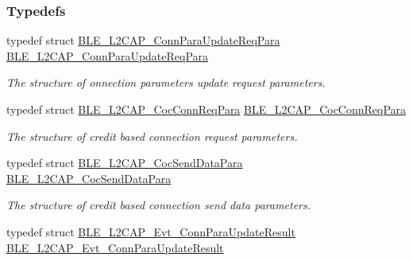 \subsubsection*{Typedefs}
\begin{DoxyCompactItemize}
\item 
typedef struct \hyperlink{struct_b_l_e___l2_c_a_p___conn_para_update_req_para}{B\+L\+E\+\_\+\+L2\+C\+A\+P\+\_\+\+Conn\+Para\+Update\+Req\+Para} \hyperlink{group___b_l_e___l2_c_a_p_gad092b75e4f1a1a8999145c26226842c8}{B\+L\+E\+\_\+\+L2\+C\+A\+P\+\_\+\+Conn\+Para\+Update\+Req\+Para}\hypertarget{group___b_l_e___l2_c_a_p_gad092b75e4f1a1a8999145c26226842c8}{}\label{group___b_l_e___l2_c_a_p_gad092b75e4f1a1a8999145c26226842c8}

\begin{DoxyCompactList}\small\item\em The structure of onnection parameters update request parameters. \end{DoxyCompactList}\item 
typedef struct \hyperlink{struct_b_l_e___l2_c_a_p___coc_conn_req_para}{B\+L\+E\+\_\+\+L2\+C\+A\+P\+\_\+\+Coc\+Conn\+Req\+Para} \hyperlink{group___b_l_e___l2_c_a_p_ga83555390496fae5534c718cad6b50442}{B\+L\+E\+\_\+\+L2\+C\+A\+P\+\_\+\+Coc\+Conn\+Req\+Para}\hypertarget{group___b_l_e___l2_c_a_p_ga83555390496fae5534c718cad6b50442}{}\label{group___b_l_e___l2_c_a_p_ga83555390496fae5534c718cad6b50442}

\begin{DoxyCompactList}\small\item\em The structure of credit based connection request parameters. \end{DoxyCompactList}\item 
typedef struct \hyperlink{struct_b_l_e___l2_c_a_p___coc_send_data_para}{B\+L\+E\+\_\+\+L2\+C\+A\+P\+\_\+\+Coc\+Send\+Data\+Para} \hyperlink{group___b_l_e___l2_c_a_p_gaf434f16d165e51ed0509c819713c0987}{B\+L\+E\+\_\+\+L2\+C\+A\+P\+\_\+\+Coc\+Send\+Data\+Para}\hypertarget{group___b_l_e___l2_c_a_p_gaf434f16d165e51ed0509c819713c0987}{}\label{group___b_l_e___l2_c_a_p_gaf434f16d165e51ed0509c819713c0987}

\begin{DoxyCompactList}\small\item\em The structure of credit based connection send data parameters. \end{DoxyCompactList}\item 
typedef struct \hyperlink{struct_b_l_e___l2_c_a_p___evt___conn_para_update_result}{B\+L\+E\+\_\+\+L2\+C\+A\+P\+\_\+\+Evt\+\_\+\+Conn\+Para\+Update\+Result} \hyperlink{group___b_l_e___l2_c_a_p_ga7012326f0f1f1b48759897d37e3c9f46}{B\+L\+E\+\_\+\+L2\+C\+A\+P\+\_\+\+Evt\+\_\+\+Conn\+Para\+Update\+Result}\hypertarget{group___b_l_e___l2_c_a_p_ga7012326f0f1f1b48759897d37e3c9f46}{}\label{group___b_l_e___l2_c_a_p_ga7012326f0f1f1b48759897d37e3c9f46}


\end{DoxyCompactItemize}
